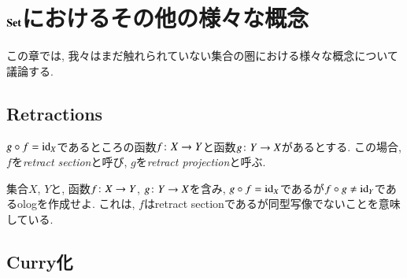 
\section{${\bf Set}$におけるその他の様々な概念}

この章では, 我々はまだ触れられていない集合の圏における様々な概念について議論する.


\subsection{Retractions}

\begin{definition}


$g\circ f=\textrm{id}_X$であるところの函数$f\colon X\rightarrow Y$と函数$g\colon Y\rightarrow X$があるとする. この場合, $f$を\emph{retract section}と呼び, $g$を\emph{retract projection}と呼ぶ. 

\end{definition}

\begin{exercise}
集合$X$, $Y$と, 函数$f\colon X\rightarrow Y$, $g\colon Y\rightarrow X$を含み, $g\circ f=\textrm{id}_X$であるが$f\circ g\neq\textrm{id}_Y$であるologを作成せよ. これは, $f$はretract sectionであるが同型写像でないことを意味している.
\end{exercise}


\subsection{Curry化}\label{sec:currying}

